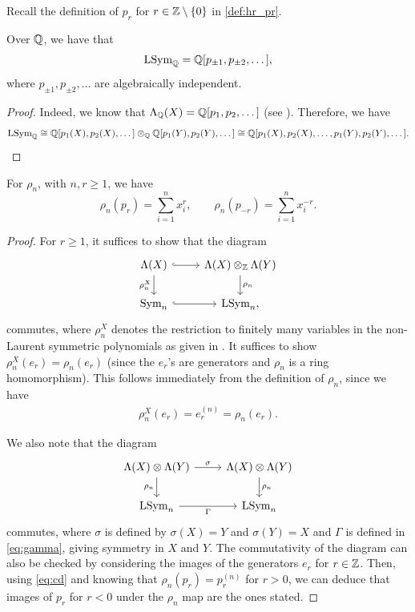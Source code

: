 \documentclass[11pt]{amsart}
\begin{document}
Recall the definition of $p_r$ for $r \in \mathbb{Z} \setminus \{0\}$ in \cref{def:hr_pr}.

\begin{cor}
    Over \(\mathbb{Q}\), we have that
    \[
        \mathrm{LSym}_{\mathbb{Q}}
        =
        \mathbb{Q}[p_{\pm1}, p_{\pm 2}, \dots],
    \]
    where \(p_{\pm1}, p_{\pm 2}, \dots\) are algebraically independent.
\end{cor}

\begin{proof}
    Indeed, we know that \(\Lambda_{\mathbb{Q}} (X) = \mathbb{Q}[p_1,p_2,\dots]\) (see \cite[Ch.~I \(\S2\)]{Mac15}). Therefore, we have
    \[
    \mathrm{LSym}_{\mathbb{Q}} \cong \mathbb{Q}[p_1(X),p_2(X),\dots] \otimes_{\mathbb{Q}} \mathbb{Q} [p_1 (Y),p_2(Y),\dots] \cong \mathbb{Q}[p_1(X),p_2(X),\dots,p_1 (Y),p_2(Y),\dots].
    \]
\end{proof}

\begin{prop} \label{prop:prhon}
For $\rho_n$, with $n, r \geq 1$, we have 
    \[
        \rho_n(p_r)=\sum_{i=1}^n x_i^r,\qquad
        \rho_n(p_{-r})=\sum_{i=1}^n x_i^{-r}.
    \]
\end{prop}

\begin{proof}
    For $r\geq 1$, it suffices to show that the diagram
    \[
\begin{tikzcd}
\Lambda (X) \arrow[r, hook] \arrow[d, "\rho_n^X"'] & \Lambda (X) \otimes_{\mathbb{Z}} \Lambda (Y) \arrow[d, "\rho_n"] \\
\mathrm{Sym}_n \arrow[r, hook]     & \mathrm{LSym}_n,      
\end{tikzcd}
\]
commutes, where $\rho_n^X$ denotes the restriction to finitely many variables in the non-Laurent symmetric polynomials as given in \cite[Ch.~I, \S2, pp.18-19]{Mac15}. It suffices to show $\rho_n^X(e_r) = \rho_n(e_r)$ (since the $e_r$'s are generators and $\rho_n$ is a ring homomorphism). This follows immediately from the definition of $\rho_n$, since we have
\begin{align*}
    \rho_n^X(e_r) = e_r^{(n)}= \rho_n(e_r).
\end{align*}

We also note that the diagram
\begin{equation}
    \begin{tikzcd}
\Lambda(X) \otimes \Lambda (Y) \arrow[r, "\sigma"] \arrow[d, "\rho_n"'] & \Lambda(X) \otimes \Lambda(Y) \arrow[d, "\rho_n"] \\
\LSym_n \arrow[r, "\Gamma"']                   & \LSym_n 
\end{tikzcd} \label{eq:cd}
\end{equation}
commutes, where $\sigma$ is defined by $\sigma(X) = Y$ and $\sigma(Y) = X$ and $\Gamma$ is defined in \cref{eq:gamma}, giving symmetry in $X$ and $Y$.
The commutativity of the diagram can also be checked by considering the images of the generators \(e_r\) for \(r \in \mathbb{Z}\). Then, using \cref{eq:cd} and knowing that \(\rho_n(p_r) = p_r^{(n)}\) for \(r > 0\), we can deduce that images of \(p_r\) for \(r < 0\) under the \(\rho_n\) map are the ones stated.
\end{proof}
\end{document}
